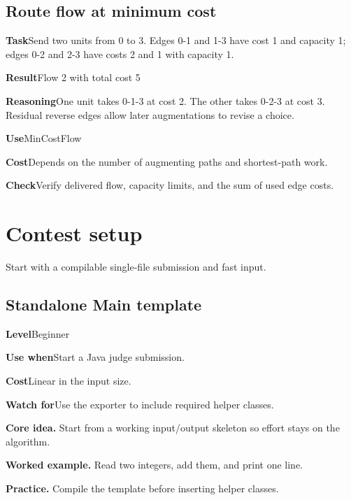 \documentclass[10pt,letterpaper]{article}
\newcommand{\entrylabel}[1]{\textcolor{accent}{\bfseries #1}}
\begin{document}
\subsection*{Route flow at minimum cost}
\noindent\entrylabel{Task}\quad Send two units from 0 to 3. Edges 0-1 and 1-3 have cost 1 and capacity 1; edges 0-2 and 2-3 have costs 2 and 1 with capacity 1.\par
\noindent\entrylabel{Result}\quad Flow 2 with total cost 5\par
\noindent\entrylabel{Reasoning}\quad One unit takes 0-1-3 at cost 2. The other takes 0-2-3 at cost 3. Residual reverse edges allow later augmentations to revise a choice.\par
\noindent\entrylabel{Use}\quad MinCostFlow\par
\noindent\entrylabel{Cost}\quad Depends on the number of augmenting paths and shortest-path work.\par
\noindent\entrylabel{Check}\quad Verify delivered flow, capacity limits, and the sum of used edge costs.\par
\clearpage
{}\section{Contest setup}
\begin{guidebox}Start with a compilable single-file submission and fast input.\end{guidebox}
\subsection{Standalone Main template}
\begin{guidebox}\small
\entrylabel{Level}\quad Beginner\par
\entrylabel{Use when}\quad Start a Java judge submission.\par
\entrylabel{Cost}\quad Linear in the input size.\par
\entrylabel{Watch for}\quad Use the exporter to include required helper classes.\par
\end{guidebox}
\noindent\textbf{Core idea.} Start from a working input/output skeleton so effort stays on the algorithm.\par
\noindent\textbf{Worked example.} Read two integers, add them, and print one line.\par
\noindent\textbf{Practice.} Compile the template before inserting helper classes.\par
\end{document}
